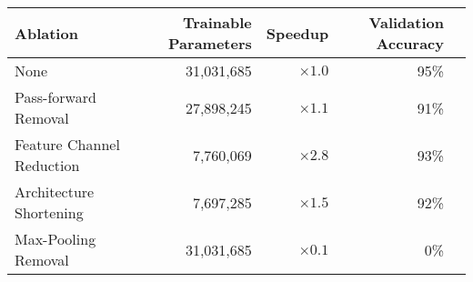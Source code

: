 \begin{tabular}{@{}lrrrr@{}}
\toprule
Ablation                  & Trainable Parameters & Speedup     & Validation Accuracy \\ \midrule
None                      & 31,031,685           & $\times1.0$ & 95\%                \\
Pass-forward Removal      & 27,898,245           & $\times1.1$ & 91\%                \\
Feature Channel Reduction & 7,760,069            & $\times2.8$ & 93\%                \\
Architecture Shortening   & 7,697,285            & $\times1.5$ & 92\%                \\
Max-Pooling Removal       & 31,031,685           & $\times0.1$ &  0\%                \\ \bottomrule
\end{tabular}